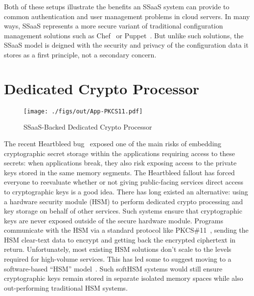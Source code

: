 Both of these setups illustrate the benefits an SSaaS system can
provide to common authentication and user management problems in cloud
servers. In many ways, SSaaS represents a more secure variant of
traditional configuration management solutions such as
Chef~\cite{chef} or Puppet~\cite{puppet}. But unlike such solutions,
the SSaaS model is deigned with the security and privacy of the
configuration data it stores as a first principle, not a secondary
concern.

\section{Dedicated Crypto Processor}

\begin{figure}[t]
  \centering
  \texttt{[image: ./figs/out/App-PKCS11.pdf]}
  \caption{SSaaS-Backed Dedicated Crypto Processor}
  \label{fig:app-pkcs11}
\end{figure}

The recent Heartbleed bug~\cite{heartbleed} exposed one of the main
risks of embedding cryptographic secret storage within the
applications requiring access to these secrets: when applications
break, they also risk exposing access to the private keys stored in
the same memory segments. The Heartbleed fallout has forced everyone
to reevaluate whether or not giving public-facing services direct
access to cryptographic keys is a good idea. There has long existed an
alternative: using a hardware security module (HSM) to perform
dedicated crypto processing and key storage on behalf of other
services. Such systems ensure that cryptographic keys are never
exposed outside of the secure hardware module. Programs communicate
with the HSM via a standard protocol like
PKCS\#11~\cite{pcks11-standard}, sending the HSM clear-text data to
encrypt and getting back the encrypted ciphertext in
return. Unfortunately, most existing HSM solutions don't scale to the
levels required for high-volume services. This has led some to suggest
moving to a software-based ``HSM'' model~\cite{lorier-pkcs11}. Such
softHSM systems would still ensure cryptographic keys remain stored in
separate isolated memory spaces while also out-performing traditional
HSM systems.


